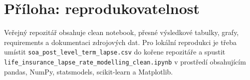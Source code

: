 \documentclass[11pt,a4paper]{article}
\theoremstyle{definition}
\begin{document}
\section{Příloha: reprodukovatelnost}
Veřejný repozitář obsahuje clean notebook, přesné výsledkové tabulky, grafy, requirements a dokumentaci zdrojových dat. Pro lokální reprodukci je třeba umístit \texttt{soa\_post\_level\_term\_lapse.csv} do kořene repozitáře a spustit \texttt{life\_insurance\_lapse\_rate\_modelling\_clean.ipynb} v prostředí obsahujícím pandas, NumPy, statsmodels, scikit-learn a Matplotlib.
\end{document}
